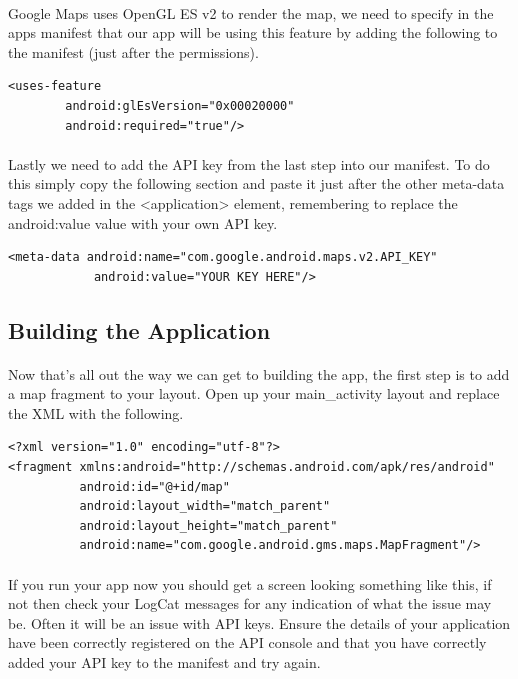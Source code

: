 \paragraph{} Google Maps uses OpenGL ES v2 to render the map, we need to specify in the apps manifest that our app will be using this feature by adding the following to the manifest (just after the permissions).

\begin{lstlisting}
<uses-feature
        android:glEsVersion="0x00020000"
        android:required="true"/>
\end{lstlisting}

\paragraph{} Lastly we need to add the API key from the last step into our manifest. To do this simply copy the following section and paste it just after the other meta-data tags we added in the <application> element, remembering to replace the android:value value with your own API key.

\begin{lstlisting}
<meta-data android:name="com.google.android.maps.v2.API_KEY"
    		android:value="YOUR KEY HERE"/>
\end{lstlisting}

\subsection{Building the Application}
\paragraph{} Now that's all out the way we can get to building the app, the first step is to add a map fragment to your layout.  Open up your main\_activity layout and replace the XML with the following.

\begin{lstlisting}
<?xml version="1.0" encoding="utf-8"?>
<fragment xmlns:android="http://schemas.android.com/apk/res/android"
          android:id="@+id/map"
          android:layout_width="match_parent"
          android:layout_height="match_parent"
          android:name="com.google.android.gms.maps.MapFragment"/>
\end{lstlisting}

\paragraph{} If you run your app now you should get a screen looking something like this, if not then check your LogCat messages for any indication of what the issue may be. Often it will be an issue with API keys. Ensure the details of your application have been correctly registered on the API console and that you have correctly added your API key to the manifest and try again.


